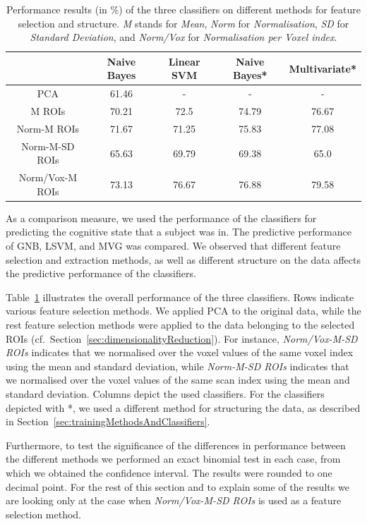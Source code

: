 \documentclass[preprint,journal,11pt]{vgtc}
\begin{document}
\begin{table}[htpb]
\centering
{\small
\begin{tabular}{c|c|c|c|c}
& \textbf{Naive Bayes} & \textbf{Linear SVM} & \textbf{Naive Bayes*} & \textbf{Multivariate*} \\ \hline
PCA & 61.46 &  - & - & - \\
M ROIs & 70.21 & 72.5 & 74.79 & 76.67 \\
Norm-M ROIs & 71.67 & 71.25 & 75.83 & 77.08 \\
Norm-M-SD ROIs & 65.63 & 69.79 & 69.38 & 65.0 \\
Norm/Vox-M ROIs & 73.13 & 76.67 & 76.88 & 79.58 \\
\end{tabular}}
\caption{Performance results (in \%) of the three classifiers on different methods for feature selection and structure. \emph{M} stands for \emph{Mean}, \emph{Norm} for \emph{Normalisation}, \emph{SD} for \emph{Standard Deviation}, and \emph{Norm/Vox} for \emph{Normalisation per Voxel index}.}
\label{tab:results}
\end{table}

As a comparison measure, we used the performance of the classifiers for predicting the cognitive state that a subject was in. The predictive performance of GNB, LSVM, and MVG was compared. We observed that different feature selection and extraction methods, as well as different structure on the data affects the predictive performance of the classifiers.

Table~\ref{tab:results} illustrates the overall performance of the three classifiers. Rows indicate various feature selection methods. We applied PCA to the original data, while the rest feature selection methods were applied to the data belonging to the selected ROIs (cf.~Section~\ref{sec:dimensionalityReduction}). For instance, \emph{Norm/Vox-M-SD ROIs} indicates that we normalised over the voxel values of the same voxel index using the mean and standard deviation, while \emph{Norm-M-SD ROIs} indicates that we normalised over the voxel values of the same scan index using the mean and standard deviation. Columns depict the used classifiers. For the classifiers depicted with *, we used a different method for structuring the data, as described in Section~\ref{sec:trainingMethodsAndClassifiers}.

Furthermore, to test the significance of the differences in performance between the different methods we performed an exact binomial test in each case, from which we obtained the confidence interval. The results were rounded to one decimal point. For the rest of this section and to explain some of the results we are looking only at the case when \emph{Norm/Vox-M-SD ROIs} is used as a feature selection method.
\end{document}
